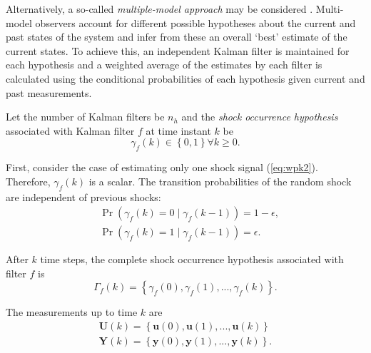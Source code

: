 Alternatively, a so-called \textit{multiple-model approach} may be considered \citep{buxbaum_recursive_1969, jaffer_estimation_1971}. Multi-model observers account for different possible hypotheses about the current and past states of the system and infer from these an overall `best' estimate of the current states. To achieve this, an independent Kalman filter is maintained for each hypothesis and a weighted average of the estimates by each filter is calculated using the conditional probabilities of each hypothesis given current and past measurements.

Let the number of Kalman filters be $n_h$ and the \textit{shock occurrence hypothesis} associated with Kalman filter $f$ at time instant $k$ be
\begin{equation} \label{eq:gammak}
	\gamma_{f}(k) \in \left\{0, 1 \right\} \forall{k \ge 0}.
\end{equation}

First, consider the case of estimating only one shock signal (\ref{eq:wpk2}). Therefore, $\gamma_{f}(k)$ is a scalar. The transition probabilities of the random shock are independent of previous shocks:
\begin{equation} \label{eq:Pr_gammak_given_gammakm1}
	\begin{aligned}
		& \Pr\left(\gamma_{f}(k)=0 \mid \gamma_{f}(k-1)\right) = 1-\epsilon, \\
		& \Pr\left(\gamma_{f}(k)=1 \mid \gamma_{f}(k-1)\right) = \epsilon.
	\end{aligned}
\end{equation}

After $k$ time steps, the complete shock occurrence hypothesis associated with filter $f$ is
\begin{equation} \label{eq:Gammak}
	\Gamma_f(k) = \left\{\gamma_f(0), \gamma_f(1), ..., \gamma_f(k) \right\}.
\end{equation}

The measurements up to time $k$ are
\begin{equation} \label{eq:Uk_Yk}
	\begin{aligned}
		\mathbf{U}(k)=\left\{\mathbf{u}(0), \mathbf{u}(1), ..., \mathbf{u}(k) \right\} \\
		\mathbf{Y}(k)=\left\{\mathbf{y}(0), \mathbf{y}(1), ..., \mathbf{y}(k) \right\}.
	\end{aligned}
\end{equation}


